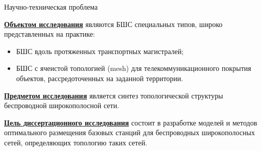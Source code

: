 \begin{frame}
    {Научно-техническая проблема}

    \textbf{\underline{Объектом исследования}} являются БШС специальных типов, широко представленных на практике:
    
    \bigskip

    \begin{itemize}
        \item БШС вдоль протяженных транспортных магистралей;
        \item БШС с ячеистой топологией (mesh) для телекоммуникационного покрытия объектов, рассредоточенных на заданной территории.
    \end{itemize}

    \bigskip

    \textbf{\underline{Предметом исследования}} является синтез топологической структуры беспроводной широкополосной сети.

    \bigskip
    
    \textbf{\underline{Цель диссертационного исследования}} состоит в разработке моделей и методов оптимального размещения базовых станций для беспроводных широкополосных сетей, определяющих топологию таких сетей.

\end{frame}

